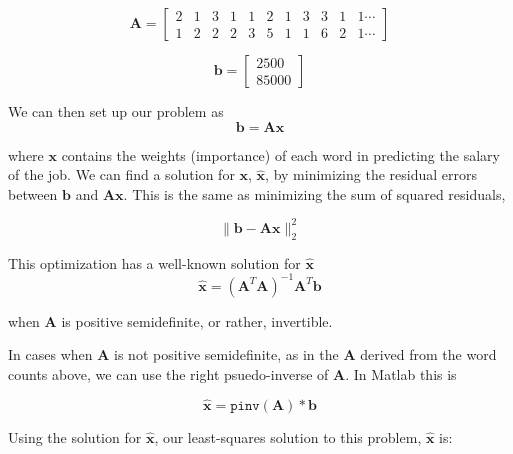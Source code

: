 \documentclass[12pt]{article}
\begin{document}
    \begin{equation*}
        \bm{A} = 
        \begin{bmatrix}
            2 & 1 & 3 & 1 & 1 & 2 & 1 & 3 & 3 & 1 & 1 \cdots \\
            1 & 2 & 2 & 2 & 3 & 5 & 1 & 1 & 6 & 2 & 1 \cdots
        \end{bmatrix}
    \end{equation*}

    \begin{equation*}
        \bm{b} = 
        \begin{bmatrix}
        2500\\
        85000
        \end{bmatrix}
    \end{equation*}

    We can then set up our problem as 
    \begin{equation}\label{eq:linsolve}
        \bm{b} = \bm{Ax}
    \end{equation}

    \noindent where $\bm{x}$ contains the weights (importance) of each word in
    predicting the salary of the job. We can find a solution for $\bm{x}$,
    $\bm{\hat{x}}$, by minimizing the residual errors between $\bm{b}$ and
    $\bm{Ax}$.  This is the same as minimizing the sum of squared residuals,

    \begin{equation}
        \|\bm{b} - \bm{Ax}\|^2_2
    \end{equation}

    \noindent This optimization has a well-known solution for $\bm{\hat{x}}$
    \begin{equation}
        \bm{\hat{x}} = (\bm{A}^{T}\bm{A})^{-1}\bm{A}^T\bm{b}
    \end{equation}

    when $\bm{A}$ is positive semidefinite, or rather, invertible.
    
    In cases when $\bm{A}$ is not positive semidefinite, as in the $\bm{A}$
    derived from the word counts above, we can use the right psuedo-inverse of
    $\bm{A}$.  In Matlab this is 
    
    \begin{equation} 
        \bm{\hat{x}} = \texttt{pinv}(\bm{A})*\bm{b}
    \end{equation}

    Using the solution for $\bm{\hat{x}}$, our least-squares solution to this
    problem, $\bm{\hat{x}}$ is:
\end{document}
